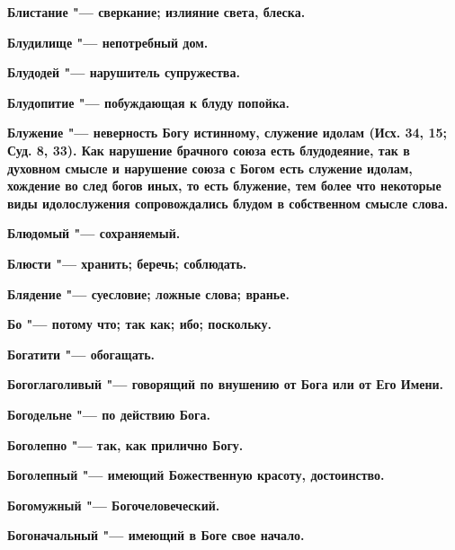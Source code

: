 \begin{mymulticols}{2}
\bfseries Блистание\normalfont{} "--- сверкание; излияние света, блеска. 




\bfseries Блудилище\normalfont{} "--- непотребный дом. 




\bfseries Блудодей\normalfont{} "--- нарушитель супружества. 




\bfseries Блудопитие\normalfont{} "--- побуждающая к блуду попойка. 




\bfseries Блужение\normalfont{} "--- неверность Богу истинному, служение идолам (Исх. 34, 15; Суд. 8, 33). Как нарушение брачного союза есть блудодеяние, так в духовном смысле и нарушение союза с Богом есть служение идолам, хождение во след богов иных, то есть блужение, тем более что некоторые виды идолослужения сопровождались блудом в собственном смысле слова. 




\bfseries Блюдомый\normalfont{} "--- сохраняемый. 




\bfseries Блюсти\normalfont{} "--- хранить; беречь; соблюдать. 




\bfseries Блядение\normalfont{} "--- суесловие; ложные слова; вранье. 




\bfseries Бо\normalfont{} "--- потому что; так как; ибо; поскольку. 




\bfseries Богатити\normalfont{} "--- обогащать. 




\bfseries Богоглаголивый\normalfont{} "--- говорящий по внушению от Бога или от Его Имени. 




\bfseries Богодельне\normalfont{} "--- по действию Бога. 




\bfseries Боголепно\normalfont{} "--- так, как прилично Богу. 




\bfseries Боголепный\normalfont{} "--- имеющий Божественную красоту, достоинство. 




\bfseries Богомужный\normalfont{} "--- Богочеловеческий. 




\bfseries Богоначальный\normalfont{} "--- имеющий в Боге свое начало. 





\end{mymulticols}
